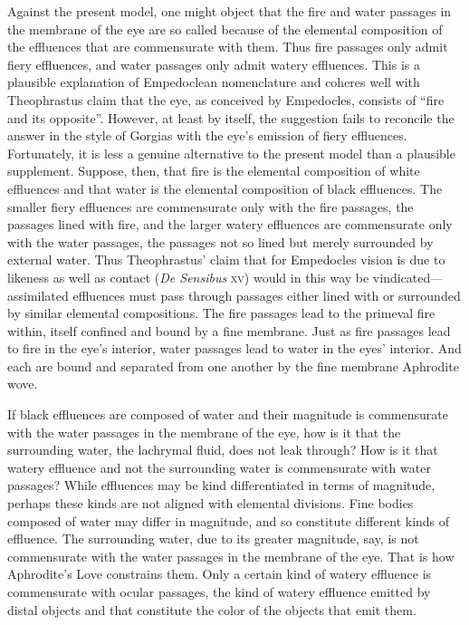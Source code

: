Against the present model, one might object that the fire and water passages in the membrane of the eye are so called because of the elemental composition of the effluences that are commensurate with them. Thus fire passages only admit fiery effluences, and water passages only admit watery effluences. This is a plausible explanation of Empedoclean nomenclature and coheres well with Theophrastus claim that the eye, as conceived by Empedocles, consists of ``fire and its opposite''. However, at least by itself, the suggestion fails to reconcile the answer in the style of Gorgias with the eye's emission of fiery effluences. Fortunately, it is less a genuine alternative to the present model than a plausible supplement. Suppose, then, that fire is the elemental composition of white effluences and that water is the elemental composition of black effluences. The smaller fiery effluences are commensurate only with the fire passages, the passages lined with fire, and the larger watery effluences are commensurate only with the water passages, the passages not so lined but merely surrounded by external water. Thus Theophrastus' claim that for Empedocles vision is due to likeness as well as contact (\emph{De Sensibus} \textsc{xv}) would in this way be vindicated---assimilated effluences must pass through passages either lined with or surrounded by similar elemental compositions. The fire passages lead to the primeval fire within, itself confined and bound by a fine membrane. Just as fire passages lead to fire in the eye's interior, water passages lead to water in the eyes' interior. And each are bound and separated from one another by the fine membrane Aphrodite wove.

If black effluences are composed of water and their magnitude is commensurate with the water passages in the membrane of the eye, how is it that the surrounding water, the lachrymal fluid, does not leak through? How is it that watery effluence and not the surrounding water is commensurate with water passages? While effluences may be kind differentiated in terms of magnitude, perhaps these kinds are not aligned with elemental divisions. Fine bodies composed of water may differ in magnitude, and so constitute different kinds of effluence. The surrounding water, due to its greater magnitude, say, is not commensurate with the water passages in the membrane of the eye. That is how Aphrodite's Love constrains them. Only a certain kind of watery effluence is commensurate with ocular passages, the kind of watery effluence emitted by distal objects and that constitute the color of the objects that emit them. 

